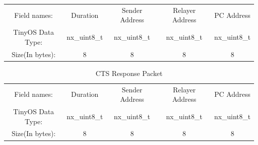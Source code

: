 \begin{enumerate}
\begin{table}[h]
    	\begin{adjustbox}{max width=\textwidth}
    	\begin{tabular}{|c c c c c|} 
    	
    		\midrule
    		Field names: & Duration & Sender Address & Relayer Address & \ac{PC} Address \\
    		
    	    TinyOS Data Type: & nx\_uint8\_t & nx\_uint8\_t & nx\_uint8\_t & nx\_uint8\_t \\
    		    
    	    Size(In bytes): & 8 & 8 & 8 & 8\\
    			
		\hline
		\end{tabular}
    	\end{adjustbox}
    	\label{tab:RTS_Request_Packet}
        \end{table}
        
        \begin{table}[h]
    	\caption{CTS Response Packet} %
    	\centering
    	
    	\begin{adjustbox}{max width=\textwidth}
    	\begin{tabular}{|c c c c c|} 
    	
    		\midrule
    		Field names: & Duration & Sender Address & Relayer Address & \ac{PC} Address \\
    		
    	    TinyOS Data Type: & nx\_uint8\_t & nx\_uint8\_t & nx\_uint8\_t & nx\_uint8\_t \\
    		    
    	    Size(In bytes): & 8 & 8 & 8 & 8\\
    			
    			\hline
    		\end{tabular}
    	\end{adjustbox}
    	\label{tab:CTS_Packet}
        \end{table}
        
    \end{enumerate}

    \par 
    



